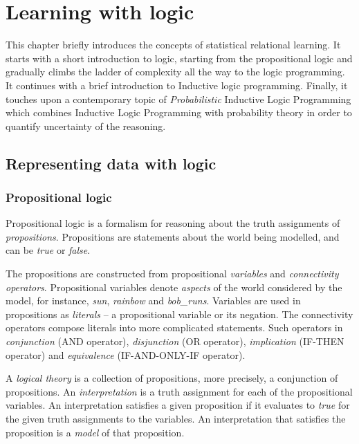 \chapter{Learning with logic}\label{ch:learninglogic}



This chapter briefly introduces the concepts of statistical relational learning.
It starts with a short introduction to logic, starting from the propositional logic and gradually climbs the ladder of complexity all the way to the logic programming.
It continues with a brief introduction to Inductive logic programming.
Finally, it touches upon a contemporary topic of \textit{Probabilistic} Inductive Logic Programming which combines Inductive Logic Programming  with probability theory in order to quantify uncertainty of the reasoning.




\section{Representing data with logic}





\subsection{Propositional logic}

Propositional logic is a formalism for reasoning about the truth assignments of \textit{propositions}.
Propositions are statements about the world being modelled, and can be \textit{true} or \textit{false}.


The propositions are constructed from propositional \textit{variables} and \textit{connectivity operators}.
Propositional variables denote \textit{aspects} of the world considered by the model, for instance, \textit{sun}, \textit{rainbow} and \textit{bob\_runs}.
Variables are used in propositions as \textit{literals} -- a propositional variable or its negation.
The connectivity operators compose literals into more complicated statements.
Such operators in \textit{conjunction} (AND operator), \textit{disjunction} (OR operator), \textit{implication} (IF-THEN operator) and \textit{equivalence} (IF-AND-ONLY-IF	operator).


A \textit{logical theory} is a collection of propositions, more precisely, a conjunction of propositions.
An \textit{interpretation} is a truth assignment for each of the propositional variables.
An interpretation satisfies a given proposition if it evaluates to \textit{true} for the given truth assignments to the variables.
An interpretation that satisfies the proposition is a \textit{model} of that proposition.



